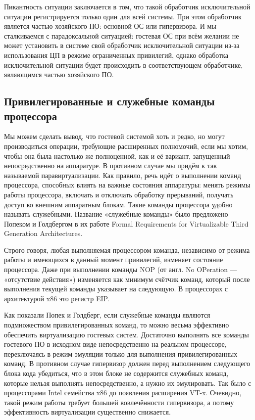 \documentclass[14pt, a4paper]{article}
\begin{document}
Пикантность ситуации заключается в том, что такой обработчик исключительной ситуации
регистрируется только один для всей системы. При этом обработчик является частью хозяйского ПО:
основной ОС или гипервизора. И мы сталкиваемся с парадоксальной ситуацией: гостевая ОС при
всём желании не может установить в системе свой обработчик исключительной ситуации из-за
использования ЦП в режиме ограниченных привилегий, однако обработка исключительной ситуации
будет происходить в соответствующем обработчике, являющимся частью хозяйского ПО.\\


\subsection*{Привилегированные и служебные команды процессора}

Мы можем сделать вывод, что гостевой системой хоть и редко, но могут производиться операции,
требующие расширенных полномочий, если мы хотим, чтобы она была настолько же полноценной,
как и её вариант, запущенный непосредственно на аппаратуре. В противном случае мы придём к так
называемой паравиртуализации. Как правило, речь идёт о выполнении команд процессора,
способных влиять на важные состояния аппаратуры: менять режимы работы процессора, включать и
отключать обработку прерываний, получать доступ ко внешним аппаратным блокам. Такие команды
процессора удобно называть служебными. Название «служебные команды» было предложено
Попеком и Голдбергом в их работе Formal Requirements for Virtualizable Third Generation Architectures.

Строго говоря, любая выполняемая процессором команда, независимо от режима работы и
имеющихся в данный момент привилегий, изменяет состояние процессора. Даже при выполнении
команды NOP (от англ. No OPeration — «отсутствие действия») изменяется как минимум счётчик
команд, который после выполнения текущей команды указывает на следующую. В процессорах с
архитектурой x86 это регистр EIP.

Как показали Попек и Голдберг, если служебные команды являются подмножеством
привилегированных команд, то можно весьма эффективно обеспечить виртуализацию гостевых
систем. Достаточно выполнять все команды гостевого ПО в исходном виде непосредственно на
реальном процессоре, переключаясь в режим эмуляции только для выполнения привилегированных
команд. В противном случае гипервизор должен перед выполнением следующего блока кода
убедиться, что в этом блоке не содержится служебных команд, которые нельзя выполнять
непосредственно, а нужно их эмулировать. Так было с процессорами Intel семейства x86 до
появления расширения VT-x. Очевидно, такой режим работы требует большей вовлечённости
гипервизора, а потому эффективность виртуализации существенно снижается.\\
\end{document}
